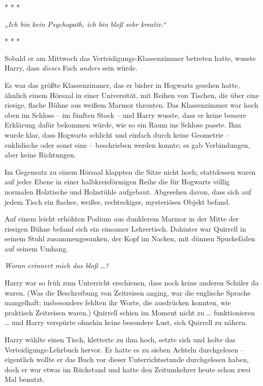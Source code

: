 

\hypertarget{laterales-denken}{%

* * *

\emph{„Ich bin kein Psychopath, ich bin bloß sehr kreativ.“}

* * *

Sobald er am Mittwoch das Verteidigungs-Klassenzimmer betreten hatte, wusste Harry, dass \emph{dieses} Fach \emph{anders} sein würde.

Es war das größte Klassenzimmer, das er bisher in Hogwarts gesehen hatte, ähnlich einem Hörsaal in einer Universität, mit Reihen von Tischen, die über eine riesige, flache Bühne aus weißem Marmor thronten. Das Klassenzimmer war hoch oben im Schloss -- im fünften Stock -- und Harry wusste, dass er keine bessere Erklärung dafür bekommen würde, wie so ein Raum ins Schloss passte. Ihm wurde klar, dass Hogwarts schlicht und einfach durch keine Geometrie -- euklidische oder sonst eine -- beschrieben werden konnte; es gab Verbindungen, aber keine Richtungen.

Im Gegensatz zu einem Hörsaal klappten die Sitze nicht hoch; stattdessen waren auf jeder Ebene in einer halbkreisförmigen Reihe die für Hogwarts völlig normalen Holztische und Holzstühle aufgebaut. Abgesehen davon, dass sich auf jedem Tisch ein flaches, weißes, rechteckiges, mysteriöses Objekt befand.

Auf einem leicht erhöhten Podium aus dunklerem Marmor in der Mitte der riesigen Bühne befand sich ein einsamer Lehrertisch. Dahinter war Quirrell in seinem Stuhl zusammengesunken, der Kopf im Nacken, mit dünnen Spuckefäden auf seinem Umhang.

\emph{Woran erinnert mich das bloß …?}

Harry war so früh zum Unterricht erschienen, dass noch keine anderen Schüler da waren. (Was die Beschreibung von Zeitreisen anging, war die englische Sprache mangelhaft; insbesondere fehlten ihr Worte, die ausdrücken konnten, wie praktisch Zeitreisen waren.) Quirrell schien im Moment nicht zu … funktionieren … und Harry verspürte ohnehin keine besondere Lust, sich Quirrell zu nähern.

Harry wählte einen Tisch, kletterte zu ihm hoch, setzte sich und holte das Verteidigungs-Lehrbuch hervor. Er hatte es zu sieben Achteln durchgelesen -- eigentlich wollte er das Buch vor dieser Unterrichtsstunde durchgelesen haben, doch er war etwas im Rückstand und hatte den Zeitumkehrer heute schon zwei Mal benutzt.

}
